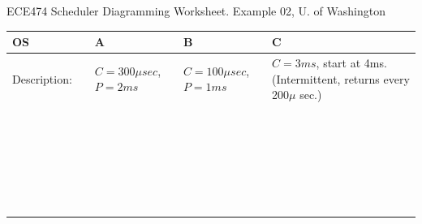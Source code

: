 \documentclass{article}
\begin{document}
ECE474 Scheduler Diagramming Worksheet.  Example 02,  U. of Washington\\
\renewcommand\arraystretch{1.7}%
\begin{tabular}{|p{1in}|p{0.2in}|p{1.2in}|p{1.2in}|p{1.2in}|}
\hline
OS      &  & A & B & C \\ \hline
Description:   &  & $C=300\mu sec$, $P=2ms$   & $C=100\mu sec$, $P=1ms$  & $C=3ms$, start at 4ms. (Intermittent, returns every 200$\mu$ sec.) \\ \hline
        &  &   &   &   \\ \hline
        &  &   &   &   \\ \hline
        &  &   &   &   \\ \hline
        &  &   &   &   \\ \hline
        &  &   &   &   \\ \hline
        &  &   &   &   \\ \hline
        &  &   &   &   \\ \hline
        &  &   &   &   \\ \hline
        &  &   &   &   \\ \hline
        &  &   &   &   \\ \hline
        &  &   &   &   \\ \hline
        &  &   &   &   \\ \hline
        &  &   &   &   \\ \hline
        &  &   &   &   \\ \hline
        &  &   &   &   \\ \hline
        &  &   &   &   \\ \hline
        &  &   &   &   \\ \hline
        &  &   &   &   \\ \hline
        &  &   &   &   \\ \hline
        &  &   &   &   \\ \hline
        &  &   &   &   \\ \hline
        &  &   &   &   \\ \hline
        &  &   &   &   \\ \hline
        &  &   &   &   \\ \hline
        &  &   &   &   \\ \hline
        &  &   &   &   \\ \hline

\end{tabular}
\newpage
\end{document}
